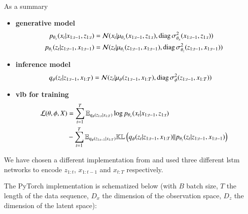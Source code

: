 As a summary
\begin{tcolorbox}[colback=blue!5!white,colframe=black!75!black,title=Variational RNN]
\begin{itemize}
    \item \textbf{generative model}
    \begin{align}
        \label{gen_model_vrnn}
        p_{\theta_x}(x_t \vert x_{1:t-1}, z_{1:t}) &= \mathcal{N}( x_t \vert \mu_{\theta_x}(x_{1:t-1}, z_{1:t}), \text{diag}\, \sigma_{\theta_x}^2(x_{1:t-1}, z_{1:t})) \\
        p_{\theta_z}(z_t \vert z_{1:t-1}, x_{1:t-1}) &= \mathcal{N}( z_t \vert \mu_{\theta_z}(z_{1:t-1}, x_{1:t-1}), \text{diag}\, \sigma_{\theta_z}^2(z_{1:t-1}, x_{1:t-1}))
    \end{align}
    \item \textbf{inference model}
    \begin{align}
        \label{inf_model_vrnn}
        q_{\phi}(z_{t} \vert z_{1:t-1}, x_{1:T}) &= \mathcal{N}( z_t \vert \mu_{\phi}(z_{1:t-1}, x_{1:T}), \text{diag}\, \sigma_{\phi}^2(z_{1:t-1}, x_{1:T}))
    \end{align}
    \item \textbf{\gls{vlb} for training}
    \begin{align}
        \label{vlb_vrnn}
        \begin{split}
        \mathcal{L}(\theta, \phi, X) &= \sum_{t=1}^T  \mathbb{E}_{q_{\phi}(z_{1:t} \vert x_{1:T})} \log{p_{\theta_x}(x_t \vert x_{1:t-1}, z_{1:t})} \\ &- \sum_{t=1}^T \mathbb{E}_{q_{\phi}(z_{1:t-1} \vert x_{1:T})} \mathbb{KL}\left( q_{\phi}(z_t \vert z_{1:t-1}, x_{1:T}) \vert\vert p_{\theta_z}(z_t \vert z_{1:t-1}, x_{1:t-1}) \right)  \end{split}
    \end{align}
\end{itemize}
\end{tcolorbox}

We have chosen a different implementation from \cite{girin_dynamical_2022} and used three different \gls{lstm} networks to encode $z_{1:t}$, $x_{1:t-1}$ and $x_{t:T}$ respectively.

The PyTorch implementation is schematized below (with $B$ batch size, $T$ the length of the data sequence, $D_x$ the dimension 
of the observation space, $D_z$ the dimension of the latent space):


%
%
%
%

